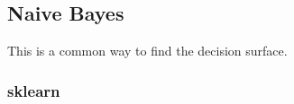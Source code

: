 \documentclass[12pt]{article}
\begin{document}
  \subsection{Naive Bayes}

  This is a common way to find the decision surface.

  \subsubsection{sklearn}
\end{document}
